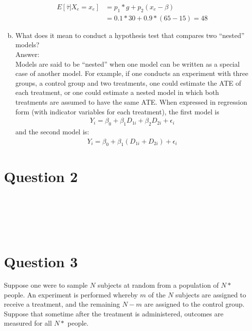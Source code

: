 \documentclass[11pt,notitlepage]{article}\usepackage[]{graphicx}\usepackage[]{color}
\makeatletter
\newenvironment{kframe}{%
 \def\at@end@of@kframe{}%
 \ifinner\ifhmode%
  \def\at@end@of@kframe{\end{minipage}}%
  \begin{minipage}{\columnwidth}%
 \fi\fi%
 \def\FrameCommand##1{\hskip\@totalleftmargin \hskip-\fboxsep
 \colorbox{shadecolor}{##1}\hskip-\fboxsep
     \hskip-\linewidth \hskip-\@totalleftmargin \hskip\columnwidth}%
 \MakeFramed {\advance\hsize-\width
   \@totalleftmargin\z@ \linewidth\hsize
   \@setminipage}}%
 {\par\unskip\endMakeFramed%
 \at@end@of@kframe}
\newenvironment{knitrout}{}{} %
\makeatother
\begin{document}
\begin{enumerate}[a)]
\begin{align*}
E[\bar{\tau}|X_e = x_e] &= p_1*g + p_2(x_e - \beta) \\
&= 0.1 * 30 + 0.9*(65-15) = 48
\end{align*}


\item  What does it mean to conduct a hypothesis test that compares two ``nested'' models?\\
Answer:\\
Models are said to be ``nested'' when one model can be written as a special case of another model. For example, if one conducts an experiment with three groups, a control group and two treatments, one could estimate the ATE of each treatment, or one could estimate a nested model in which both treatments are assumed to have the same ATE.  When expressed in regression form (with indicator variables for each treatment), the first model is 
\begin{align*}
Y_i = \beta_0 + \beta_1 D_{1i} + \beta_2 D_{2i} + \epsilon_i
\end{align*}
and the second model is:
\begin{align*}
Y_i = \beta_0 + \beta_1 (D_{1i} + D_{2i}) + \epsilon_i
\end{align*}

\end{enumerate}


\section*{Question 2}
\begin{knitrout}
\color{fgcolor}\begin{kframe}
\begin{verbatim}





\end{verbatim}
\end{kframe}
\end{knitrout}



\section*{Question 3}
Suppose one were to sample $N$ subjects at random from a population of $N*$ people. An experiment is performed whereby $m$ of the $N$ subjects are assigned to receive a treatment, and the remaining $N - m$ are assigned to the control group. Suppose that sometime after the treatment is administered, outcomes are measured for all $N*$ people.
\end{document}
